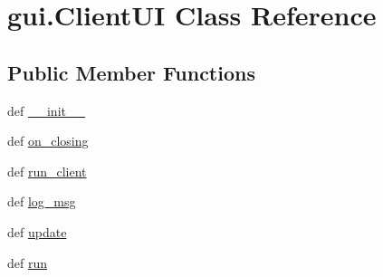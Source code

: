 \hypertarget{classgui_1_1_client_u_i}{\section{gui.\-Client\-U\-I \-Class \-Reference}
\label{classgui_1_1_client_u_i}
}
\subsection*{\-Public \-Member \-Functions}
\begin{DoxyCompactItemize}
\item 
def \hyperlink{classgui_1_1_client_u_i_aa49bff1ac3bb1d4e91f9310b842c98bc}{\-\_\-\-\_\-init\-\_\-\-\_\-}
\item 
def \hyperlink{classgui_1_1_client_u_i_a3f4aa7e1bd1cadd45ab850e39d7fe7a4}{on\-\_\-closing}
\item 
def \hyperlink{classgui_1_1_client_u_i_aa4ab6e7b6dd74977e7cdf677bc170887}{run\-\_\-client}
\item 
def \hyperlink{classgui_1_1_client_u_i_a6440ea5d84ec763cfe9e0aba944a6c5c}{log\-\_\-msg}
\item 
def \hyperlink{classgui_1_1_client_u_i_ae094737217a5bcccc7c5b39d5c02438f}{update}
\item 
def \hyperlink{classgui_1_1_client_u_i_a8ae1c306feeea088a5a72e3f81f5d673}{run}
\end{DoxyCompactItemize}
